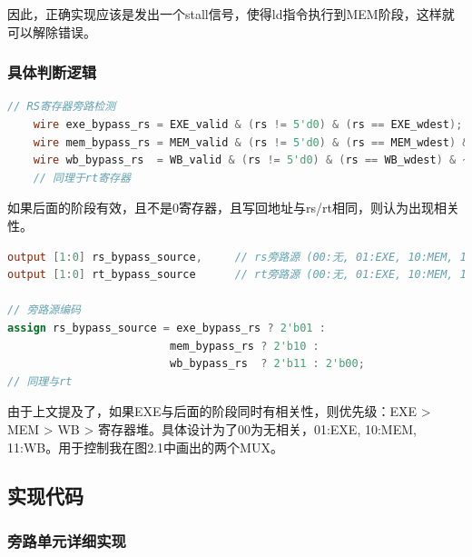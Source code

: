 \documentclass[a4paper]{article}
\begin{document}
因此，正确实现应该是发出一个stall信号，使得ld指令执行到MEM阶段，这样就可以解除错误。

\subsubsection{具体判断逻辑}


\begin{lstlisting}[language=Verilog,caption={是否出现相关性}]
    // RS寄存器旁路检测
    wire exe_bypass_rs = EXE_valid & (rs != 5'd0) & (rs == EXE_wdest);
    wire mem_bypass_rs = MEM_valid & (rs != 5'd0) & (rs == MEM_wdest) & ~exe_bypass_rs;
    wire wb_bypass_rs  = WB_valid & (rs != 5'd0) & (rs == WB_wdest) & ~exe_bypass_rs & ~mem_bypass_rs;
    // 同理于rt寄存器
\end{lstlisting}

如果后面的阶段有效，且不是0寄存器，且写回地址与rs/rt相同，则认为出现相关性。

\begin{lstlisting}[language=Verilog,caption={旁路源编码（优先级检测）}]
output [1:0] rs_bypass_source,     // rs旁路源 (00:无, 01:EXE, 10:MEM, 11:WB)
output [1:0] rt_bypass_source      // rt旁路源 (00:无, 01:EXE, 10:MEM, 11:WB)

// 旁路源编码
assign rs_bypass_source = exe_bypass_rs ? 2'b01 :
                         mem_bypass_rs ? 2'b10 :
                         wb_bypass_rs  ? 2'b11 : 2'b00;
// 同理与rt
\end{lstlisting}

由于上文提及了，如果EXE与后面的阶段同时有相关性，则优先级：EXE > MEM > WB > 寄存器堆。具体设计为了00为无相关，01:EXE, 10:MEM, 11:WB。用于控制我在图2.1中画出的两个MUX。

\newpage

\subsection{实现代码}


\subsubsection{旁路单元详细实现}
\end{document}
